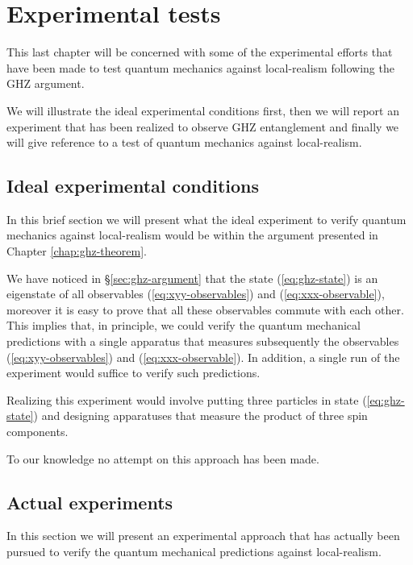 \chapter{Experimental tests}
\label{chap:ghz-experiments}
This last chapter will be concerned with some of the experimental efforts that have been made to test quantum mechanics against local-realism following the GHZ argument.

We will illustrate the ideal experimental conditions first, then we will report an experiment that has been realized to observe GHZ entanglement and finally we will give reference to a test of quantum mechanics against local-realism.

\section{Ideal experimental conditions}
In this brief section we will present what the ideal experiment to verify quantum mechanics against local-realism would be within the argument presented in Chapter \ref{chap:ghz-theorem}.%

We have noticed in \S \ref{sec:ghz-argument} that the state (\ref{eq:ghz-state}) is an eigenstate of all observables (\ref{eq:xyy-observables}) and (\ref{eq:xxx-observable}), moreover it is easy to prove that all these observables commute with each other. This implies that, in principle, we could verify the quantum mechanical predictions with a single apparatus that measures subsequently the observables (\ref{eq:xyy-observables}) and (\ref{eq:xxx-observable}). In addition, a single run of the experiment would suffice to verify such predictions.

Realizing this experiment would involve putting three particles in state (\ref{eq:ghz-state}) and designing apparatuses that measure the product of three spin components.%

To our knowledge no attempt on this approach has been made.


\section{Actual experiments}
In this section we will present an experimental approach that has actually been pursued to verify the quantum mechanical predictions against local-realism.

